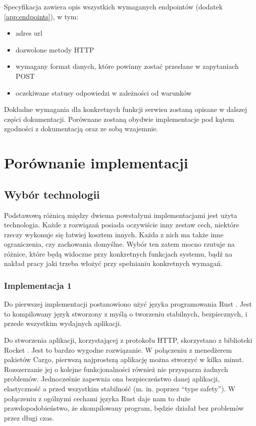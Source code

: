 \documentclass[12pt, notitlepage]{article}
\begin{document}
Specyfikacja zawiera opis wszystkich wymaganych endpointów (dodatek \ref{app:endpoints}), w tym:
\begin{itemize}
    \item adres url
    \item dozwolone metody HTTP
    \item wymagany format danych, które powinny zostać przesłane w zapytaniach POST
    \item oczekiwane statusy odpowiedzi w zależności od warunków
\end{itemize}

Dokładne wymagania dla konkretnych funkcji serwisu zostaną opisane w dalszej części dokumentacji. Porównane zostaną obydwie implementacje pod kątem zgodności z dokumentacją oraz ze sobą wzajemnie.

\section{Porównanie implementacji}

\subsection{Wybór technologii}

Podstawową różnicą między dwiema powstałymi implementacjami jest użyta technologia. Każde z rozwiązań posiada oczywiście inny zestaw cech, niektóre rzeczy wykonuje się łatwiej kosztem innych. Każda z nich ma także inne ograniczenia, czy zachowania domyślne. Wybór ten zatem mocno rzutuje na różnice, które będą widoczne przy konkretnych funkcjach systemu, bądź na nakład pracy jaki trzeba włożyć przy spełnianiu konkretnych wymagań.

\subsubsection{Implementacja 1}

Do pierwszej implementacji postanowiono użyć języka programowania Rust \cite{rust}. Jest to kompilowany język stworzony z myślą o tworzeniu stabilnych, bezpiecznych, i przede wszystkim wydajnych aplikacji.

Do stworzenia aplikacji, korzystającej z protokołu HTTP, skorzystano z biblioteki Rocket \cite{rocket}. Jest to bardzo wygodne rozwiązanie. W połączeniu z menedżerem pakietów Cargo, pierwszą najprostszą aplikację można stworzyć w kilka minut. Rozszerzanie jej o kolejne funkcjonalności również nie przysparza żadnych problemów. Jednocześnie zapewnia ona bezpieczeństwo danej aplikacji, elastyczność a przed wszystkim stabilność (m. in. poprzez ``type safety''). W połączeniu z ogólnymi cechami języka Rust daje nam to duże prawdopodobieństwo, że skompilowany program, będzie działał bez problemów przez długi czas.
\end{document}
